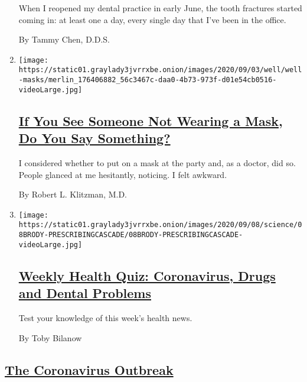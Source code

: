 \begin{enumerate}
  When I reopened my dental practice in early June, the tooth fractures
  started coming in: at least one a day, every single day that I've been
  in the office.

  By Tammy Chen, D.D.S.
\item
  \texttt{[image: https://static01.graylady3jvrrxbe.onion/images/2020/09/03/well/well-masks/merlin\_176406882\_56c3467c-daa0-4b73-973f-d01e54cb0516-videoLarge.jpg]}

  \hypertarget{if-you-see-someone-not-wearing-a-mask-do-you-say-something}{%
  \subsection{\texorpdfstring{\href{/2020/09/10/well/live/mask-shaming.html}{If
  You See Someone Not Wearing a Mask, Do You Say
  Something?}}{If You See Someone Not Wearing a Mask, Do You Say Something?}}\label{if-you-see-someone-not-wearing-a-mask-do-you-say-something}}

  I considered whether to put on a mask at the party and, as a doctor,
  did so. People glanced at me hesitantly, noticing. I felt awkward.

  By Robert L. Klitzman, M.D.
\item
  \texttt{[image: https://static01.graylady3jvrrxbe.onion/images/2020/09/08/science/08BRODY-PRESCRIBINGCASCADE/08BRODY-PRESCRIBINGCASCADE-videoLarge.jpg]}

  \hypertarget{weekly-health-quiz-coronavirus-drugs-and-dental-problems}{%
  \subsection{\texorpdfstring{\href{/interactive/2020/09/11/well/live/11healthquiz-09112020.html}{Weekly
  Health Quiz: Coronavirus, Drugs and Dental
  Problems}}{Weekly Health Quiz: Coronavirus, Drugs and Dental Problems}}\label{weekly-health-quiz-coronavirus-drugs-and-dental-problems}}

  Test your knowledge of this week's health news.

  By Toby Bilanow
\end{enumerate}

\hypertarget{the-coronavirus-outbreak}{%
\subsection{\texorpdfstring{\href{/news-event/coronavirus}{The
Coronavirus
Outbreak}}{The Coronavirus Outbreak}}\label{the-coronavirus-outbreak}}

